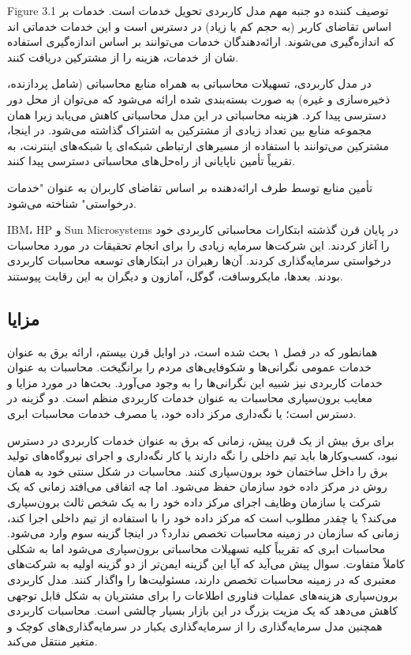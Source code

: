 \documentclass{book}
\begin{document}
            Figure 3.1 توصیف کننده دو جنبه مهم مدل کاربردی تحویل خدمات است. خدمات بر اساس تقاضای کاربر (به حجم کم یا زیاد) در دسترس است و این خدمات خدماتی اند که اندازه‌گیری می‌شوند. ارائه‌دهندگان خدمات می‌توانند بر اساس اندازه‌گیری استفاده شان از خدمات، هزینه را از مشترکین دریافت کنند.

            در مدل کاربردی، تسهیلات محاسباتی به همراه منابع محاسباتی (شامل پردازنده، ذخیره‌سازی و غیره) به صورت بسته‌بندی شده ارائه می‌شود که می‌توان از محل دور دسترسی پیدا کرد. هزینه محاسباتی در این مدل محاسباتی کاهش می‌یابد زیرا همان مجموعه منابع بین تعداد زیادی از مشترکین به اشتراک گذاشته می‌شود. در اینجا، مشترکین می‌توانند با استفاده از مسیرهای ارتباطی شبکه‌ای یا شبکه‌های اینترنت، به تقریباً تأمین ناپایانی از راه‌حل‌های محاسباتی دسترسی پیدا کنند.

            \begin{addinfo}
                
                تأمین منابع توسط طرف ارائه‌دهنده بر اساس تقاضای کاربران به عنوان "خدمات درخواستی" شناخته می‌شود.

            \end{addinfo}

            IBM، HP و Sun Microsystems در پایان قرن گذشته ابتکارات محاسباتی کاربردی خود را آغاز کردند. این شرکت‌ها سرمایه زیادی را برای انجام تحقیقات در مورد محاسبات درخواستی سرمایه‌گذاری کردند. آن‌ها رهبران در ابتکارهای توسعه محاسبات کاربردی بودند. بعدها، مایکروسافت، گوگل، آمازون و دیگران به این رقابت پیوستند.

            \subsection{مزایا}

                همانطور که در فصل ۱ بحث شده است، در اوایل قرن بیستم، ارائه برق به عنوان خدمات عمومی نگرانی‌ها و شکوفایی‌های مردم را برانگیخت. محاسبات به عنوان خدمات کاربردی نیز شبیه این نگرانی‌ها را به وجود می‌آورد. بحث‌ها در مورد مزایا و معایب برون‌سپاری محاسبات به عنوان خدمات کاربردی منظم است. دو گزینه در دسترس است؛ یا نگه‌داری مرکز داده خود، یا مصرف خدمات محاسبات ابری.

                برای برق بیش از یک قرن پیش، زمانی که برق به عنوان خدمات کاربردی در دسترس نبود، کسب‌وکارها باید تیم داخلی را نگه دارند یا کار نگه‌داری و اجرای نیروگاه‌های تولید برق را داخل ساختمان خود برون‌سپاری کنند. محاسبات در شکل سنتی خود به همان روش در مرکز داده خود سازمان حفظ می‌شود. اما چه اتفاقی می‌افتد زمانی که یک شرکت یا سازمان وظایف اجرای مرکز داده خود را به یک شخص ثالث برون‌سپاری می‌کند؟ یا چقدر مطلوب است که مرکز داده خود را با استفاده از تیم داخلی اجرا کند، زمانی که سازمان در زمینه محاسبات تخصص ندارد؟ در اینجا گزینه سوم وارد می‌شود. محاسبات ابری که تقریباً کلیه تسهیلات محاسباتی برون‌سپاری می‌شود اما به شکلی کاملاً متفاوت. سوال پیش می‌آید که آیا این گزینه ایمن‌تر از دو گزینه اولیه به شرکت‌های معتبری که در زمینه محاسبات تخصص دارند، مسئولیت‌ها را واگذار کنند. مدل کاربردی برون‌سپاری هزینه‌های عملیات فناوری اطلاعات را برای مشتریان به شکل قابل توجهی کاهش می‌دهد که یک مزیت بزرگ در این بازار بسیار چالشی است. محاسبات کاربردی همچنین مدل سرمایه‌گذاری را از سرمایه‌گذاری یکبار در سرمایه‌گذاری‌های کوچک و متغیر منتقل می‌کند.
            
\end{document}
